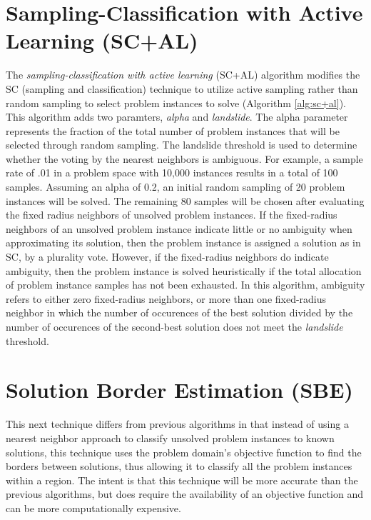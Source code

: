 \section{Sampling-Classification with Active Learning (SC+AL)}
The \textit {sampling-classification with active learning} (SC+AL) algorithm modifies the SC (sampling and classification) technique to utilize active sampling rather than random sampling to select problem instances to solve (Algorithm \ref{alg:sc+al}).  This algorithm adds two paramters, \textit{alpha} and \textit{landslide}.  The alpha parameter represents the fraction of the total number of problem instances that will be selected through random sampling.   The landslide threshold is used to determine whether the voting by the nearest neighbors is ambiguous.  For example, a sample rate of .01 in a problem space with 10,000 instances results in a total of 100 samples.  Assuming an alpha of 0.2, an initial random sampling of 20 problem instances will be solved.  The remaining 80 samples will be  chosen after evaluating the fixed radius neighbors of unsolved problem instances. If the fixed-radius neighbors of an unsolved problem instance indicate little or no ambiguity when approximating its solution, then the problem instance is assigned a solution as in SC, by a plurality vote.  However, if the fixed-radius neighbors do indicate ambiguity, then the problem instance is solved heuristically if the total allocation of problem instance samples has not been exhausted.  In this algorithm, ambiguity refers to either zero fixed-radius neighbors, or more than one fixed-radius neighbor in which the number of occurences of the best solution divided by the number of occurences of the second-best solution does not meet the \textit{landslide} threshold.



\section{Solution Border Estimation (SBE)}

This next technique differs from previous algorithms in that instead of using a nearest neighbor approach to classify unsolved problem instances to known solutions, this technique uses the problem domain's objective function to find the borders between solutions, thus allowing it to classify all the problem instances within a region.  The intent is that this technique will be more accurate than the previous algorithms, but does require the availability of an objective function and can be more computationally expensive.

